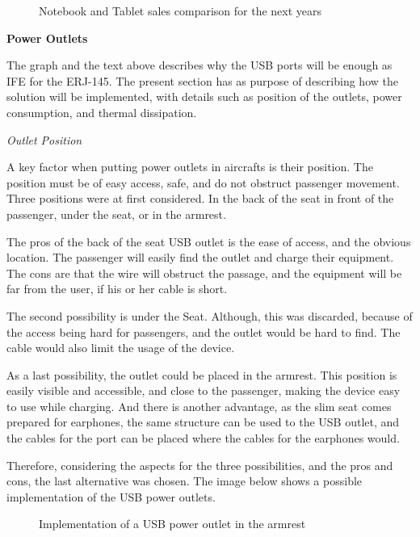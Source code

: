 \begin{figure}[H] %
\caption{Notebook and Tablet sales comparison for the next years}
\label{fig:tabletvsnotebook}
\end{figure}

\textbf{Power Outlets}

The graph and the text above describes why the USB ports will be enough as IFE for the ERJ-145. The present section has as purpose of describing how the solution will be implemented, with details such as position of the outlets, power consumption, and thermal dissipation.

\textit{Outlet Position}

A key factor when putting power outlets in aircrafts is their position. The position must be of easy access, safe, and do not obstruct passenger movement. Three positions were at first considered. In the back of the seat in front of the passenger, under the seat, or in the armrest.

The pros of the back of the seat USB outlet is the ease of access, and the obvious location. The passenger will easily find the outlet and charge their equipment. The cons are that the wire will obstruct the passage, and the equipment will be far from the user, if his or her cable is short.

The second possibility is under the Seat. Although, this was discarded, because of the access being hard for passengers, and the outlet would be hard to find. The cable would also limit the usage of the device.

As a last possibility, the outlet could be placed in the armrest. This position is easily visible and accessible, and close to the passenger, making the device easy to use while charging. And there is another advantage, as the slim seat comes prepared for earphones, the same structure can be used to the USB outlet, and the cables for the port can be placed where the cables for the earphones would.

Therefore, considering the aspects for the three possibilities, and the pros and cons, the last alternative was chosen. The image below shows a possible implementation of the USB power outlets.



\begin{figure}[H] %
\caption{Implementation of a USB power outlet in the armrest}
\label{fig:usbpoweroutlet}
\end{figure}

